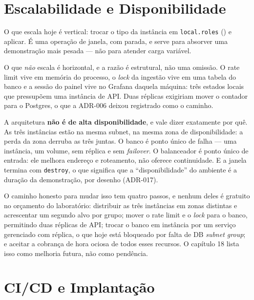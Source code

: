 \documentclass[11pt,a4paper]{article}
\begin{document}
\section{Escalabilidade e Disponibilidade}

O que escala hoje é vertical: trocar o tipo da instância em \texttt{local.roles}
() e aplicar. É uma operação de janela, com parada, e serve para absorver
uma demonstração mais pesada --- não para atender carga variável.

O que \emph{não} escala é horizontal, e a razão é estrutural, não uma omissão. O rate limit vive em
memória do processo, o \emph{lock} da ingestão vive em uma tabela do banco e a sessão do painel vive
no Grafana daquela máquina: três estados locais que pressupõem uma instância de API. Duas réplicas
exigiriam mover o contador para o Postgres, o que a ADR-006 deixou registrado como o caminho.

A arquitetura \textbf{não é de alta disponibilidade}, e vale dizer exatamente por quê. As três
instâncias estão na mesma subnet, na mesma zona de disponibilidade: a perda da zona derruba as três
juntas. O banco é ponto único de falha --- uma instância, um volume, sem réplica e sem
\emph{failover}. O balanceador é ponto único de entrada: ele melhora endereço e roteamento, não
oferece continuidade. E a janela termina com \texttt{destroy}, o que significa que a
``disponibilidade'' do ambiente é a duração da demonstração, por desenho (ADR-017).

O caminho honesto para mudar isso tem quatro passos, e nenhum deles é gratuito no orçamento do
laboratório: distribuir as três instâncias em zonas distintas e acrescentar um segundo alvo por
grupo; mover o rate limit e o \emph{lock} para o banco, permitindo duas réplicas de API; trocar o
banco em instância por um serviço gerenciado com réplica, o que hoje está bloqueado por falta de DB
\emph{subnet group}; e aceitar a cobrança de hora ociosa de todos esses recursos. O capítulo 18
lista isso como melhoria futura, não como pendência.

\section{CI/CD e Implantação}
\end{document}
